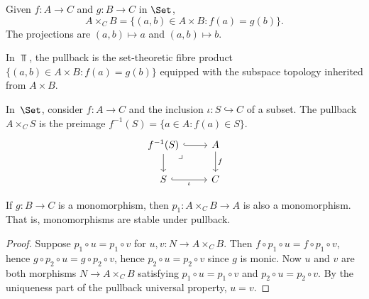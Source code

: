 \begin{example}\label{ex:pullback-set}
Given $f\colon A\to C$ and $g\colon B\to C$ in $\Set$,
\[
    A\times_C B = \{(a,b)\in A\times B : f(a) = g(b)\}.
\]
The projections are $(a,b)\mapsto a$ and $(a,b)\mapsto b$.
\end{example}

\begin{example}\label{ex:pullback-top}
In $\Top$, the pullback is the set-theoretic fibre product
$\{(a,b)\in A\times B : f(a) = g(b)\}$ equipped with the
subspace topology inherited from $A\times B$.
\end{example}

\begin{example}\label{ex:pullback-preimage}
In~$\Set$, consider $f\colon A\to C$ and the inclusion
$\iota\colon S\hookrightarrow C$ of a subset.
The pullback $A\times_C S$ is the preimage
$f^{-1}(S) = \{a\in A : f(a)\in S\}$.
\[
\begin{tikzcd}
f^{-1}(S) \arrow[r, hook] \arrow[d]
  \arrow[dr, phantom, "\lrcorner" very near start]
& A \arrow[d, "f"] \\
S \arrow[r, hook, "\iota"'] & C
\end{tikzcd}
\]
\end{example}

\begin{proposition}\label{prop:pullback-of-mono}
If $g\colon B\to C$ is a monomorphism, then $p_1\colon A\times_C B\to A$
is also a monomorphism.  That is, monomorphisms are stable under pullback.
\end{proposition}

\begin{proof}
Suppose $p_1\circ u = p_1\circ v$ for $u,v\colon N\to A\times_C B$.
Then $f\circ p_1\circ u = f\circ p_1\circ v$, hence
$g\circ p_2\circ u = g\circ p_2\circ v$, hence
$p_2\circ u = p_2\circ v$ since $g$ is monic.
Now $u$ and $v$ are both morphisms $N\to A\times_C B$ satisfying
$p_1\circ u = p_1\circ v$ and $p_2\circ u = p_2\circ v$.
By the uniqueness part of the pullback universal property, $u = v$.
\end{proof}


